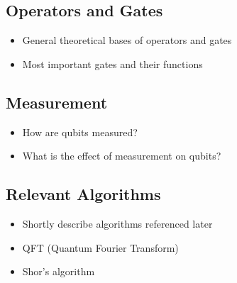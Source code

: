 \subsection{Operators and Gates}
\begin{itemize}
    \item General theoretical bases of operators and gates
    \item Most important gates and their functions
\end{itemize}

\subsection{Measurement}
\begin{itemize}
    \item How are qubits measured?
    \item What is the effect of measurement on qubits?
\end{itemize}

\subsection{Relevant Algorithms}
\begin{itemize}
    \item Shortly describe algorithms referenced later
    \item QFT (Quantum Fourier Transform) 
    \item Shor's algorithm 
\end{itemize}